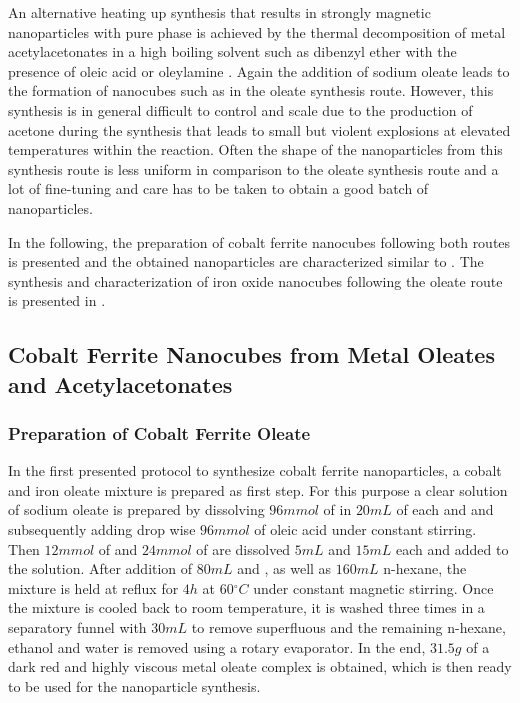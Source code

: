 \documentclass[\main/dresen_thesis.tex]{subfiles}
\begin{document}
  An alternative heating up synthesis that results in strongly magnetic nanoparticles with pure phase is achieved by the thermal decomposition of metal acetylacetonates in a high boiling solvent such as dibenzyl ether with the presence of oleic acid or oleylamine \cite{Sun_2002_SizeC, Wu_2014_Monol}.
  Again the addition of sodium oleate leads to the formation of nanocubes such as in the oleate synthesis route.
  However, this synthesis is in general difficult to control and scale due to the production of acetone during the synthesis that leads to small but violent explosions at elevated temperatures within the reaction.
  Often the shape of the nanoparticles from this synthesis route is less uniform in comparison to the oleate synthesis route and a lot of fine-tuning and care has to be taken to obtain a good batch of nanoparticles.

  In the following, the preparation of cobalt ferrite nanocubes following both routes is presented and the obtained nanoparticles are characterized similar to .
  The synthesis and characterization of iron oxide nanocubes following the oleate route is presented in .

  \subsection{Cobalt Ferrite Nanocubes from Metal Oleates and Acetylacetonates}
    \subsubsection{Preparation of Cobalt Ferrite Oleate}
      In the first presented protocol to synthesize cobalt ferrite nanoparticles, a cobalt and iron oleate mixture is prepared as first step.
      For this purpose a clear solution of sodium oleate is prepared by dissolving $96 \unit{mmol}$ of  in $20 \unit{mL}$ of each  and  and subsequently adding drop wise $96 \unit{mmol}$ of oleic acid under constant stirring.
      Then $12 \unit{mmol}$ of  and $24 \unit{mmol}$ of  are dissolved $5 \unit{mL}$  and $15 \unit{mL}$  each and added to the solution.
      After addition of $80 \unit{mL}$  and , as well as $160 \unit{mL}$ n-hexane, the mixture is held at reflux for $4 \unit{h}$ at $60 \unit{^\circ C}$ under constant magnetic stirring.
      Once the mixture is cooled back to room temperature, it is washed three times in a separatory funnel with $30 \unit{mL}$  to remove superfluous  and the remaining n-hexane, ethanol and water is removed using a rotary evaporator.
      In the end, $31.5 \unit{g}$ of a dark red and highly viscous metal oleate complex is obtained, which is then ready to be used for the nanoparticle synthesis.
\end{document}
